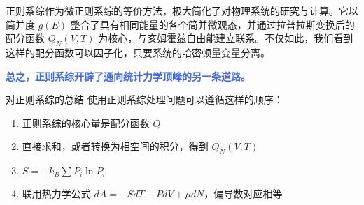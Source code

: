 正则系综作为微正则系综的等价方法，极大简化了对物理系统的研究与计算。它以简并度 $g(E)$ 整合了具有相同能量的各个简并微观态，并通过拉普拉斯变换后的配分函数 $Q_N(V,T)$ 为核心，与亥姆霍兹自由能建立联系。不仅如此，我们看到这样的配分函数可以因子化，只要系统的哈密顿量变量分离。

\textcolor{RoyalBlue}{\textbf{\kaishu 总之，正则系综开辟了通向统计力学顶峰的另一条道路。}}

\begin{understanding}{\kaishu 对正则系综的总结}
\kaishu \fontsize{11pt}{16pt}
使用正则系综处理问题可以遵循这样的顺序：
\begin{enumerate}
    \item 正则系综的核心量是配分函数 $Q$
    \item 直接求和，或者转换为相空间的积分，得到 $Q_N(V,T)$
    \item $S = -k_B \sum P_i \ln P_i$
    \item 联用热力学公式 $dA = -SdT - PdV + \mu dN$，偏导数对应相等
\end{enumerate}

\end{understanding}
